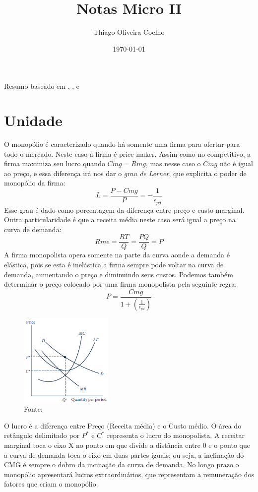 \documentclass[12pt,a4paper,oneside,brazil]{abntex2}
\title{Notas Micro II}
\author{Thiago Oliveira Coelho}
\date{\today}
\begin{document}
\pagestyle{headings}
\maketitle
\begin{center}
Resumo baseado em \cite{mas}, \cite{nicholson}, \cite{varian} e \cite{pindyck}
\end{center}
\tableofcontents

\chapter{ Unidade}
O monopólio é caracterizado quando há somente uma firma para ofertar para todo o mercado. Neste caso a firma é price-maker. Assim como no competitivo, a firma maximiza seu lucro quando $Cmg = Rmg$, mas nesse caso o $Cmg$ não é igual ao preço, e essa diferença irá nos dar o \emph{grau de Lerner}, que explicita o poder de monopólio da firma:
\[ L = \frac{P - Cmg}{P} = -\frac{1}{\epsilon_{pd}}\]
Esse grau é dado como porcentagem da diferença entre preço e custo marginal. \newline
Outra particularidade é que a receita média neste caso será igual a preço na curva de demanda:
\[ Rme = \frac{RT}{Q} = \frac{P Q}{Q} = P \]
A firma monopolista opera somente na parte da curva aonde a demanda é elástica, pois se esta é inelástica a firma sempre pode voltar na curva de demanda, aumentando o preço e diminuindo seus custos. Podemos também determinar o preço colocado por uma firma monopolista pela seguinte regra:
\[ P = \frac{Cmg}{1 + (\frac{1}{\epsilon_{pd}})}\]

\begin{figure}
	\includegraphics[width=0.4\textwidth]{Monopoly.png}
	\centering
	\caption{Fonte: \cite{nicholson}}
\end{figure}
O lucro é a diferença entre Preço (Receita média) e o Custo médio. O área do retângulo delimitado por $P^*$ e  $C^*$ representa o lucro do monopolista. A receitar marginal toca o eixo X no ponto em que divide a distância entre 0 e o ponto que a curva de demanda toca o eixo em duas partes iguais; ou seja, a inclinação do CMG é sempre o dobro da incinação da curva de demanda. No longo prazo o monopólio apresentará lucros extraordinários, que representam a remuneração dos fatores que criam o monopólio.
\clearpage
\end{document}
